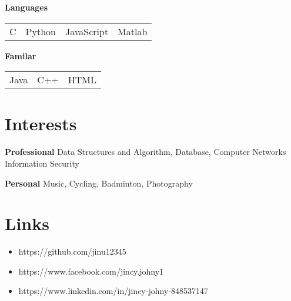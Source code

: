 \documentclass[]{cv-style}          %
\begin{document}
  \vspace{-0.2cm}
  \begin{entrylist}
\entry
 {\textbf{Languages}}
{}
{}
{\begin{tabular}{p{} p{} p{} p{}}
 C & Python &  JavaScript &  Matlab  \\ 
\end{tabular}}
  {\vspace{-0.3cm}}
\end{entrylist}
%
\begin{entrylist}
\entry
 {\textbf{Familar}}
{}
{}
{\begin{tabular}{p{} p{} p{}}
 Java & C++ &  HTML\\
\end{tabular}}
\end{entrylist}
%
\section{Interests}
\vspace{-0.3cm}
  {}

\begin{entrylist}
\entry
 {\textbf{Professional}}
{}
  {}
  {Data Structures and Algorithm, Database, Computer Networks\\ Information Security }
\end{entrylist}
%
\begin{entrylist}
\entry
 {\textbf{Personal}}
{}
  {}
  {Music, Cycling, Badminton, Photography }

\end{entrylist}
%
\section{Links}
\begin{itemize}
\item https://github.com/jinu12345
\item https://www.facebook.com/jincy.johny1
\item https://www.linkedin.com/in/jincy-johny-848537147
\end{itemize}
\end{document}
